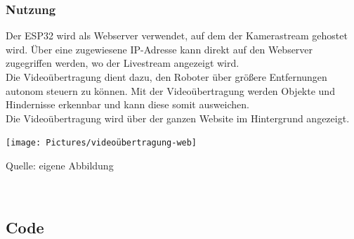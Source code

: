 \documentclass[ngerman,12pt,a4paper]{article}
\begin{document}
		\subsubsection{Nutzung}
		Der ESP32 wird als Webserver verwendet, auf dem der Kamerastream gehostet wird. Über eine zugewiesene IP-Adresse kann direkt auf den Webserver zugegriffen werden, wo der Livestream angezeigt wird. \\[0.5cm]
		Die Videoübertragung dient dazu, den Roboter über größere Entfernungen autonom steuern zu können. Mit der Videoübertragung werden Objekte und Hindernisse erkennbar und kann diese somit ausweichen. \\[0.5cm]
		Die Videoübertragung wird über der ganzen Website im Hintergrund angezeigt. \\
		\begin{center}
			\begin{minipage}[t]{1\textwidth}
				\texttt{[image: Pictures/videoübertragung-web]}
				\label{fig:videoübertragung-web}
				\vspace{-10pt}
				\begin{center}
					\par\small Quelle: eigene Abbildung 
				\end{center}
			\end{minipage} \\[0.75cm]
		\end{center}
		
		\newpage \noindent
		\subsection{Code} %
\end{document}
